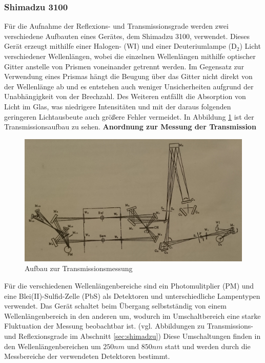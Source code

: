     \subsubsection{Shimadzu 3100}
        Für die Aufnahme der Reflexions- und Transmissionsgrade werden zwei verschiedene Aufbauten eines Gerätes, dem Shimadzu 3100, verwendet. Dieses Gerät erzeugt mithilfe einer Halogen- (WI) und einer Deuteriumlampe (D$_2$) Licht verschiedener Wellenlängen, wobei die einzelnen Wellenlängen mithilfe optischer Gitter anstelle von Prismen voneinander getrennt werden. Im Gegensatz zur Verwendung eines Prismas hängt die Beugung über das Gitter nicht direkt von der Wellenlänge ab und es entstehen auch weniger Unsicherheiten aufgrund der Unabhängigkeit von der Brechzahl. Des Weiteren entfällt die Absorption von Licht im Glas, was niedrigere Intensitäten und mit der daraus folgenden geringeren Lichtausbeute auch größere Fehler vermeidet. In Abbildung \ref{aufb:transmiss} ist der Transmissionsaufbau zu sehen. 
        \textbf{Anordnung zur Messung der Transmission}\\
            \begin{figure}
                \includegraphics[scale=0.15]{pic/transmiss_aufbau.png}
                \caption{Aufbau zur Transmissionsmessung}
                \label{aufb:transmiss}
            \end{figure}
            Für die verschiedenen Wellenlängenbereiche sind ein Photomulitplier (PM) und eine Blei(II)-Sulfid-Zelle (PbS) als Detektoren und unterschiedliche Lampentypen verwendet. Das Gerät schaltet beim Übergang selbstständig von einem Wellenlängenbereich in den anderen um, wodurch im Umschaltbereich eine starke Fluktuation der Messung beobachtbar ist. (vgl. Abbildungen zu Transmissions- und Reflexionsgrade im Abschnitt \ref{sec:shimadzu})
            Diese Umschaltungen finden in den Wellenlängenbereichen um $250\unit{nm}$ und $850\unit{nm}$ statt und werden durch die Messbereiche der verwendeten Detektoren bestimmt. 
